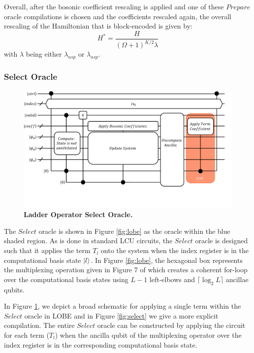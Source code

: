 Overall, after the bosonic coefficient rescaling is applied and one of these $Prepare$ oracle compilations is chosen and the coefficients rescaled again, the overall rescaling of the Hamiltonian that is block-encoded is given by:
\begin{equation}
    \label{post-process}
    H^* = \frac{H}{(\Omega + 1)^{K/2} \lambda}
\end{equation}
with $\lambda$ being either $\lambda_{usp}$ or $\lambda_{asp}$.

\subsubsection{Select Oracle}
\label{subsubsec:select}

\begin{figure}
    \centering
    \includegraphics[width=16cm]{figures/select-broad.pdf}
    \caption{\textbf{Ladder Operator Select Oracle.}
    }
    \label{fig:select-broad}
\end{figure}

The $Select$ oracle is shown in Figure \ref{fig:lobe} as the oracle within the blue shaded region.
As is done in standard LCU circuits, the $Select$ oracle is designed such that it applies the term $T_l$ onto the system when the index register is in the computational basis state $\ket{l}$.
In Figure \ref{fig:lobe}, the hexagonal box represents the multiplexing operation given in Figure 7 of \cite{babbush2018encoding} which creates a coherent for-loop over the computational basis states using $L - 1$ left-elbows and $\lceil \log_2{L} \rceil$ ancillae qubits.

In Figure \ref{fig:select-broad}, we depict a broad schematic for applying a single term within the $Select$ oracle in LOBE and in Figure \ref{fig:select} we give a more explicit compilation.
The entire $Select$ oracle can be constructed by applying the circuit for each term ($T_l$) when the ancilla qubit of the multiplexing operator over the index register is in the corresponding computational basis state.

